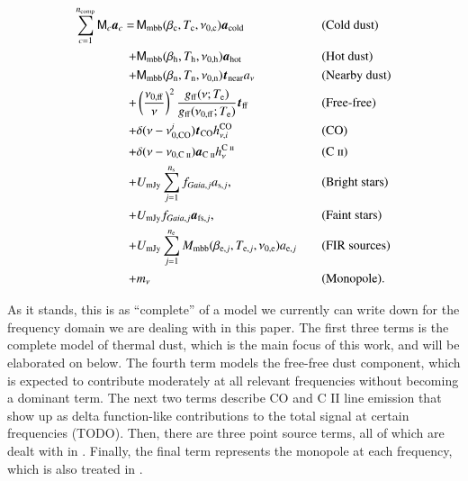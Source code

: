 \documentclass{aa}
\newcommand{\mathsc}[1]{{\normalfont\textsc{#1}}}
\newcommand{\M}[0]{\tens{M}}
\renewcommand{\a}[0]{\vec{a}}
\renewcommand{\t}[0]{\vec{t}}
\newcommand{\cii}{\ensuremath{\mathsc {C\ ii}}}
\def\Tcold{\ifmmode T_\mathrm{c}\else $T_{\mathrm{c}}$\fi}
\def\Thot{\ifmmode T_\mathrm{h}\else $T_{\mathrm{h}}$\fi}
\def\Tnear{\ifmmode T_\mathrm{n}\else $T_{\mathrm{n}}$\fi}
\def\bcold{\ifmmode \beta_\mathrm{c}\else $\beta_{\mathrm{c}}$\fi}
\def\bhot{\ifmmode \beta_\mathrm{h}\else $\beta_{\mathrm{h}}$\fi}
\def\bnear{\ifmmode \beta_\mathrm{n}\else $\beta_{\mathrm{n}}$\fi}
\def\nuzeroff{\ifmmode \nu_{0,\mathrm{ff}}\else $\nu_{0,\mathrm{ff}}$\fi}
\def\nuzerocold{\ifmmode \nu_{0,\mathrm{c}}\else $\nu_{0,\mathrm{c}}$\fi}
\def\nuzerohot{\ifmmode \nu_{0,\mathrm{h}}\else $\nu_{0,\mathrm{h}}$\fi}
\def\nuzeronear{\ifmmode \nu_{0,\mathrm{n}}\else $\nu_{0,\mathrm{n}}$\fi}
\def\Te{\ifmmode T_{\mathrm{e}}\else $T_{\mathrm{e}}$\fi}
\begin{document}
\begin{alignat}{4}
  \sum_{c=1}^{n_{\mathrm{comp}}} \M_c \a_c  = \,
  &\M_{\mathrm{mbb}}(\bcold,\Tcold,\nuzerocold)\vec{a}_{\mathrm{cold}}
  && \textrm{(Cold dust)}\label{eq:skymodel}\\
  + &\M_{\mathrm{mbb}}(\bhot,\Thot,\nuzerohot)
  \vec{a}_{\mathrm{hot}} && \textrm{(Hot dust)}\nonumber \\
  + &\M_{\mathrm{mbb}}(\bnear,\Tnear,\nuzeronear) \t_{\mathrm{near}}
  a_{\nu} && \textrm{(Nearby dust)} \nonumber \\
  + &\left(\frac{\nuzeroff}{\nu}\right)^2
  \frac{g_{\mathrm{ff}}(\nu;\Te) }{g_{\mathrm{ff}}(\nuzeroff;\Te)}
  \vec{t}_{\mathrm{ff}} && \textrm{(Free-free)} \nonumber\\
  + &\delta(\nu-\nu_{0,\mathrm{CO}}^i) \t_{\mathrm{CO}}
  h^{\mathrm{CO}}_{\nu,i} && \textrm{(CO)}\nonumber\\
  + &\delta(\nu-\nu_{0,\cii}) \a_{\cii}
	h^{\cii}_{\nu} && (\cii)\nonumber \\
  + &U_{\mathrm{mJy}} \sum_{j=1}^{n_{\mathrm{s}}}
  f_{\mathit{Gaia},j} a_{\mathrm{s},j}, &\quad&
  \textrm{(Bright stars)} \nonumber\\
  + &U_{\mathrm{mJy}} f_{\mathit{Gaia},j} \a_{\mathrm{fs},j}, &\quad&
  \textrm{(Faint stars)} \nonumber\\  
    + &U_{\mathrm{mJy}} \sum_{j=1}^{n_{\mathrm{e}}}
  M_{\mathrm{mbb}}(\beta_{\mathrm{e},j},
  T_{\mathrm{e},j}, \nu_{0,\mathrm{e}})
  a_{\mathrm{e},j} && \textrm{(FIR sources)}\nonumber\\
  + &m_{\nu} && \textrm{(Monopole)}. \nonumber
\end{alignat}

As it stands, this is as ``complete'' of a model we currently can write down
for the frequency domain we are dealing with in this paper. The first three
terms is the complete model of thermal dust, which is the main focus of this
work, and will be elaborated on below. The fourth term models the free-free
dust component, which is expected to contribute moderately at all relevant
frequencies without becoming a dominant term. The next two terms describe CO
and C II line emission that show up as delta function-like contributions to the
total signal at certain frequencies (TODO). Then, there are three point source
terms, all of which are dealt with in \citet{CG02_04}. Finally, the final term
represents the monopole at each frequency, which is also treated in
\citet{CG02_03}.
\end{document}
